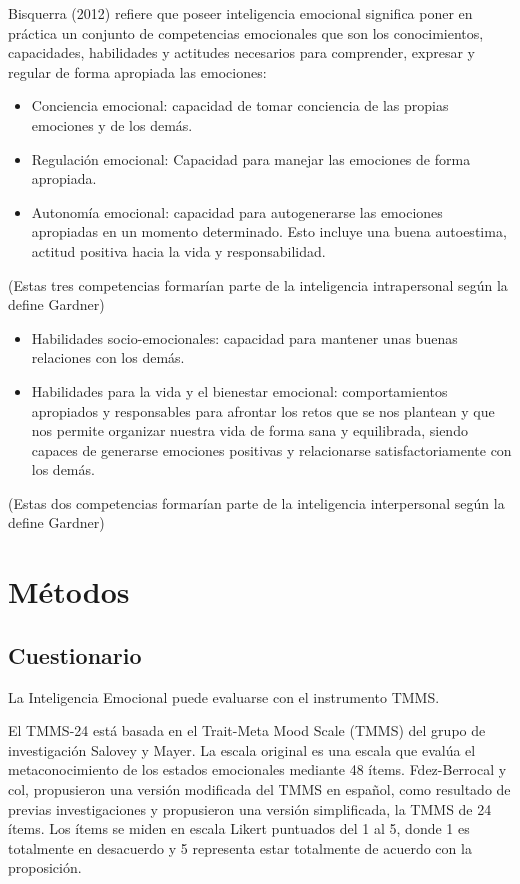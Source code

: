 \documentclass[
  10pt,
  spanish,
]{article}
\providecommand{\tightlist}{%
  \setlength{\itemsep}{0pt}\setlength{\parskip}{0pt}}
\begin{document}
Bisquerra (2012) refiere que poseer inteligencia emocional significa
poner en práctica un conjunto de competencias emocionales que son los
conocimientos, capacidades, habilidades y actitudes necesarios para
comprender, expresar y regular de forma apropiada las emociones:

\begin{itemize}
\tightlist
\item
  Conciencia emocional: capacidad de tomar conciencia de las propias
  emociones y de los demás.
\item
  Regulación emocional: Capacidad para manejar las emociones de forma
  apropiada.
\item
  Autonomía emocional: capacidad para autogenerarse las emociones
  apropiadas en un momento determinado. Esto incluye una buena
  autoestima, actitud positiva hacia la vida y responsabilidad.
\end{itemize}

(Estas tres competencias formarían parte de la inteligencia
intrapersonal según la define Gardner)

\begin{itemize}
\tightlist
\item
  Habilidades socio-emocionales: capacidad para mantener unas buenas
  relaciones con los demás.
\item
  Habilidades para la vida y el bienestar emocional: comportamientos
  apropiados y responsables para afrontar los retos que se nos plantean
  y que nos permite organizar nuestra vida de forma sana y equilibrada,
  siendo capaces de generarse emociones positivas y relacionarse
  satisfactoriamente con los demás.
\end{itemize}

(Estas dos competencias formarían parte de la inteligencia interpersonal
según la define Gardner)

\hypertarget{muxe9todos}{%
\section{Métodos}\label{muxe9todos}}

\hypertarget{cuestionario}{%
\subsection{Cuestionario}\label{cuestionario}}

La Inteligencia Emocional puede evaluarse con el instrumento TMMS.

El TMMS-24 está basada en el Trait-Meta Mood Scale (TMMS) del grupo de
investigación Salovey y Mayer. La escala original es una escala que
evalúa el metaconocimiento de los estados emocionales mediante 48 ítems.
Fdez-Berrocal y col, propusieron una versión modificada del TMMS en
español, como resultado de previas investigaciones y propusieron una
versión simplificada, la TMMS de 24 ítems. Los ítems se miden en escala
Likert puntuados del 1 al 5, donde 1 es totalmente en desacuerdo y 5
representa estar totalmente de acuerdo con la proposición.
\end{document}
